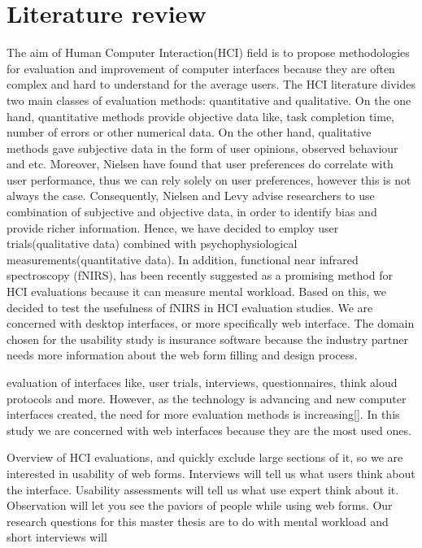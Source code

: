 \documentclass[a4paper]{report}
\begin{document}
\chapter{Literature review}
	The aim of Human Computer Interaction(HCI) field is to propose methodologies for evaluation and improvement of computer interfaces because they are often complex and hard to understand for the average users. The HCI literature divides two main classes of evaluation methods: quantitative and qualitative. On the one hand, quantitative methods provide objective data like, task completion time, number of errors or other numerical data. On the other hand, qualitative methods gave subjective data in the form of user opinions, observed behaviour and etc. Moreover, Nielsen\cite{nielsen1994measuring} have found that user preferences do correlate with user performance, thus we can rely solely on user preferences, however this is not always the case. Consequently, Nielsen and Levy \cite{nielsen1994measuring} advise researchers to use combination of subjective and objective data, in order to identify bias and provide richer information. Hence, we have decided to employ user trials(qualitative data) combined with psychophysiological measurements(quantitative data). In addition, functional near infrared spectroscopy (fNIRS), has been recently suggested as a promising method for HCI evaluations\cite{maior2015examining,pike2014measuring} because it can measure mental workload\cite{maior2014continuous}.  Based on this, we decided to test the usefulness of fNIRS in HCI evaluation studies. We are concerned with desktop interfaces, or more specifically web interface. The domain chosen for the usability study is insurance software because the industry partner needs more information about the web form filling and design process. 
	
	evaluation of interfaces like, user trials, interviews, questionnaires, think aloud protocols and more. However, as the technology is advancing and new computer interfaces created, the need for more evaluation methods is increasing[]. In this study we are concerned with web interfaces because they are the most used ones.
	
	Overview of HCI evaluations, and quickly exclude large sections of it, so we are interested in usability of web forms. Interviews will tell us what users think about the interface. Usability assessments will tell us what use expert think about it. Observation will let you see the paviors of people while using web forms. Our research questions for this master thesis are to do with mental workload and short interviews will
	
\end{document}
